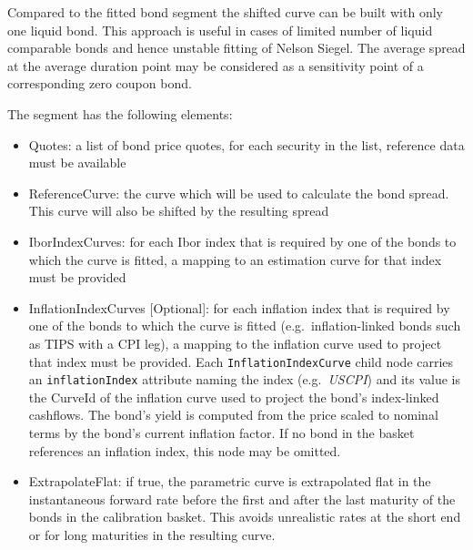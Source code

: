 Compared to the fitted bond segment the shifted curve can be built with only one liquid bond. This approach is useful in
cases of limited number of liquid comparable bonds and hence unstable fitting of Nelson Siegel. The average spread
at the average duration point may be considered as a sensitivity point of a corresponding zero coupon bond.

The segment has the following elements:

\begin{itemize}
  \item Quotes: a list of bond price quotes, for each security in the list, reference data must be available
  \item ReferenceCurve: the curve which will be used to calculate the bond spread. This curve will also be shifted by the resulting spread
  \item IborIndexCurves: for each Ibor index that is required by one of the bonds to which the curve is fitted, a mapping
    to an estimation curve for that index must be provided
  \item InflationIndexCurves [Optional]: for each inflation index that is required by one of the bonds to which the curve
    is fitted (e.g.\ inflation-linked bonds such as TIPS with a CPI leg), a mapping to the inflation curve used to project
    that index must be provided. Each \lstinline!InflationIndexCurve! child node carries an \lstinline!inflationIndex!
    attribute naming the index (e.g.\ \emph{USCPI}) and its value is the CurveId of the inflation curve used to project
    the bond's index-linked cashflows. The bond's yield is computed from the price scaled to nominal terms by the bond's
    current inflation factor. If no bond in the basket references an inflation index, this node may be omitted.
  \item ExtrapolateFlat: if true, the parametric curve is extrapolated flat in the instantaneous forward rate before the
    first and after the last maturity of the bonds in the calibration basket. This avoids unrealistic rates at the short
    end or for long maturities in the resulting curve.
  \end{itemize}

